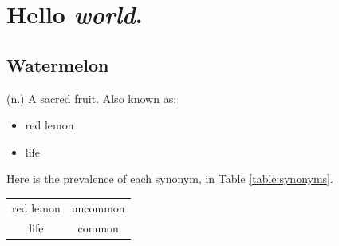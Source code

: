 \documentclass{article}
\begin{document}
\section{Hello \textit{world}.}
\subsection{Watermelon}
(n.) A sacred fruit. Also known as:
\begin{itemize}
\item red lemon
\item life
\end{itemize}
Here is the prevalence of each synonym, in Table \ref{table:synonyms}.
\begin{tabular}{c c}\label{table:synonyms}
red lemon & uncommon \\ \n
life & common
\end{tabular}
\end{document}
